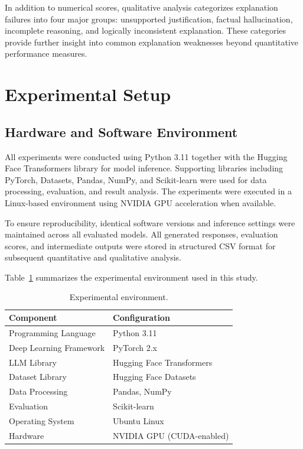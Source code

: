 \documentclass{article}
\begin{document}
In addition to numerical scores, qualitative analysis categorizes explanation failures into four major groups: unsupported justification, factual hallucination, incomplete reasoning, and logically inconsistent explanation. These categories provide further insight into common explanation weaknesses beyond quantitative performance measures.





\section{Experimental Setup}

\subsection{Hardware and Software Environment}

All experiments were conducted using Python 3.11 together with the Hugging Face Transformers library for model inference. Supporting libraries including PyTorch, Datasets, Pandas, NumPy, and Scikit-learn were used for data processing, evaluation, and result analysis. The experiments were executed in a Linux-based environment using NVIDIA GPU acceleration when available.

To ensure reproducibility, identical software versions and inference settings were maintained across all evaluated models. All generated responses, evaluation scores, and intermediate outputs were stored in structured CSV format for subsequent quantitative and qualitative analysis.

Table~\ref{tab:environment} summarizes the experimental environment used in this study.

\begin{table}[h]
\centering
\caption{Experimental environment.}
\label{tab:environment}
\begin{tabular}{ll}
\hline
\textbf{Component} & \textbf{Configuration} \\
\hline
Programming Language & Python 3.11 \\
Deep Learning Framework & PyTorch 2.x \\
LLM Library & Hugging Face Transformers \\
Dataset Library & Hugging Face Datasets \\
Data Processing & Pandas, NumPy \\
Evaluation & Scikit-learn \\
Operating System & Ubuntu Linux \\
Hardware & NVIDIA GPU (CUDA-enabled) \\
\hline
\end{tabular}
\end{table}
\end{document}

